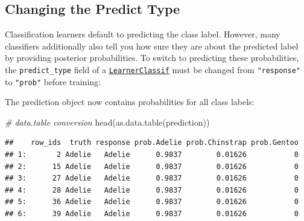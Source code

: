 \documentclass[
]{scrbook}
\newenvironment{Shaded}{\begin{snugshade}}{\end{snugshade}}
\newcommand{\AttributeTok}[1]{\textcolor[rgb]{0.77,0.63,0.00}{#1}}
\newcommand{\CommentTok}[1]{\textcolor[rgb]{0.56,0.35,0.01}{\textit{#1}}}
\newcommand{\FunctionTok}[1]{\textcolor[rgb]{0.00,0.00,0.00}{#1}}
\newcommand{\NormalTok}[1]{#1}
\newcommand{\OtherTok}[1]{\textcolor[rgb]{0.56,0.35,0.01}{#1}}
\newcommand{\SpecialCharTok}[1]{\textcolor[rgb]{0.00,0.00,0.00}{#1}}
\newcommand{\StringTok}[1]{\textcolor[rgb]{0.31,0.60,0.02}{#1}}
\renewenvironment{Shaded} {\begin{snugshade}\small} {\end{snugshade}}
\begin{document}
\hypertarget{predict-type}{%
\subsection{Changing the Predict Type}\label{predict-type}}

Classification learners default to predicting the class label.
However, many classifiers additionally also tell you how sure they are about the predicted label by providing posterior probabilities.
To switch to predicting these probabilities, the \texttt{predict\_type} field of a \href{https://mlr3.mlr-org.com/reference/LearnerClassif.html}{\texttt{LearnerClassif}} must be changed from \texttt{"response"} to \texttt{"prob"} before training:

\begin{Shaded}
\end{Shaded}

The prediction object now contains probabilities for all class labels:

\begin{Shaded}
\begin{Highlighting}[]
\CommentTok{\# data.table conversion}
\FunctionTok{head}\NormalTok{(}\FunctionTok{as.data.table}\NormalTok{(prediction))}
\end{Highlighting}
\end{Shaded}

\begin{verbatim}
##    row_ids  truth response prob.Adelie prob.Chinstrap prob.Gentoo
## 1:       2 Adelie   Adelie      0.9837        0.01626           0
## 2:      15 Adelie   Adelie      0.9837        0.01626           0
## 3:      27 Adelie   Adelie      0.9837        0.01626           0
## 4:      28 Adelie   Adelie      0.9837        0.01626           0
## 5:      36 Adelie   Adelie      0.9837        0.01626           0
## 6:      39 Adelie   Adelie      0.9837        0.01626           0
\end{verbatim}
\end{document}
